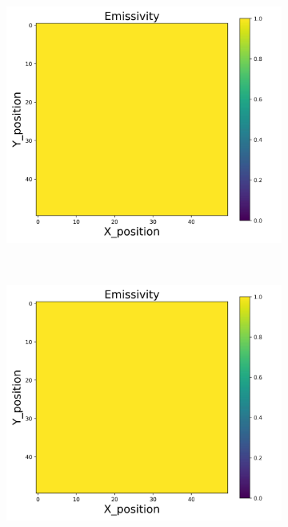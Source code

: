 {\begin{figure}[h]
\begin{minipage}{\textwidth}
\begin{subfigure}{0.27\textwidth}
        \end{subfigure}
        \begin{subfigure}{0.27\textwidth}
            \centering
            \includegraphics[width=\textwidth]{figures/raw_data/21/T3500/exp/emi_cal.jpg}
        \end{subfigure}
    \end{minipage}\\
    \begin{minipage}{\textwidth}
        \centering
        \begin{subfigure}{0.27\textwidth}
            \centering
            \includegraphics[width=\textwidth]{figures/raw_data/22/T3500/exp/emi_cal.jpg}

\end{subfigure}
\end{minipage}
\end{figure}}
